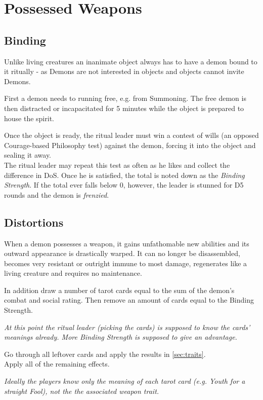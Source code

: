 \section{Possessed Weapons}
\label{sec:possessedweapon}
\subsection{Binding}
Unlike living creatures an inanimate object always has to have a demon bound to it ritually
- as Demons are not interested in objects and objects cannot invite Demons.
\par
First a demon needs to running free, e.g. from Summoning.
The free demon is then distracted or incapacitated for 5 minutes while the object is prepared to house the spirit.
\par
Once the object is ready, the ritual leader must win a contest of wills
	(an opposed Courage-based Philosophy test)
	against the demon, forcing it into the object and sealing it away.
\\%
The ritual leader may repeat this test as often as he likes and collect the difference in DoS.
Once he is satisfied, the total is noted down as the \emph{Binding Strength}.
If the total ever falls below 0, however,
	the leader is stunned for D5 rounds
	and the demon is \emph{frenzied}.

\subsection{Distortions}
When a demon possesses a weapon, it gains unfathomable new abilities and its outward appearance is drastically warped.
It can no longer be disassembled, becomes very resistant or outright immune to most damage, regenerates like a living creature and requires no maintenance.
\par
In addition draw a number of tarot cards equal to
	the sum of the demon's combat and social rating.
Then remove an amount of cards equal to the Binding Strength.
\begin{exampleblock}
	\itshape
	At this point the ritual leader (picking the cards) is supposed to know the cards' meanings already.
	More Binding Strength is supposed to give an advantage.
\end{exampleblock}
Go through all leftover cards and apply the results in \ref{sec:traits}.
\\%
Apply all of the remaining effects.
\begin{exampleblock}
	\itshape
	Ideally the players know only the meaning of each tarot card
	(e.g. \emph{Youth} for a straight Fool),
	not the the associated weapon trait.
\end{exampleblock}

